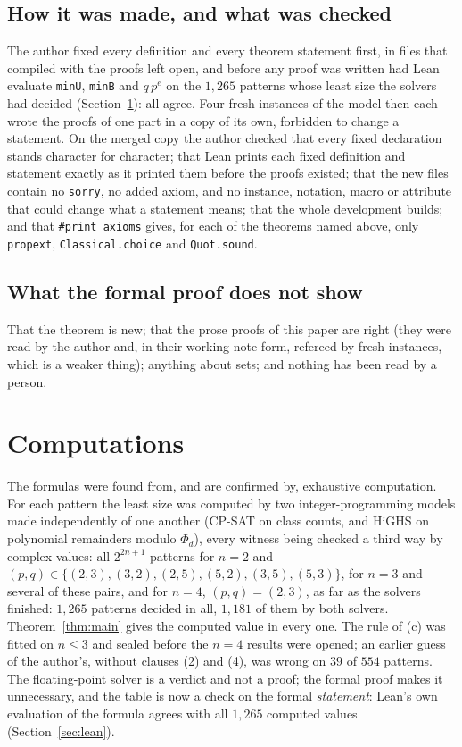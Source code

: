 \documentclass[11pt,a4paper]{amsart}
\theoremstyle{definition}
\theoremstyle{remark}
\newcommand{\lean}[1]{\texttt{#1}}
\begin{document}
\subsection*{How it was made, and what was checked} The author fixed every definition and every theorem
statement first, in files that compiled with the proofs left open, and before any proof was written had Lean
evaluate \lean{minU}, \lean{minB} and $q\,p^{e}$ on the $1{,}265$ patterns whose least size the solvers had
decided (Section~\ref{sec:computations}): all agree. Four fresh instances of the model then each wrote the
proofs of one part in a copy of its own, forbidden to change a statement. On the merged copy the author
checked that every fixed declaration stands character for character; that Lean prints each fixed definition
and statement exactly as it printed them before the proofs existed; that the new files contain no
\lean{sorry}, no added axiom, and no instance, notation, macro or attribute that could change what a statement
means; that the whole development builds; and that \lean{\#print axioms} gives, for each of the theorems named
above, only \lean{propext}, \lean{Classical.choice} and \lean{Quot.sound}. %

\subsection*{What the formal proof does not show} That the theorem is new; that the prose proofs of this
paper are right (they were read by the author and, in their working-note form, refereed by fresh instances,
which is a weaker thing); anything about sets; and nothing has been read by a person.


\section{Computations}\label{sec:computations}

The formulas were found from, and are confirmed by, exhaustive computation. For each pattern the least size
was computed by two integer-programming models made independently of one another (CP-SAT on class counts,
and HiGHS on polynomial remainders modulo $\Phi_d$), every witness being checked a third way by complex
values: all $2^{2n+1}$ patterns for $n=2$ and $(p,q)\in\{(2,3),(3,2),(2,5),(5,2),(3,5),(5,3)\}$, for $n=3$
and several of these pairs, and for $n=4$, $(p,q)=(2,3)$, as far as the solvers finished: $1{,}265$ patterns
decided in all, $1{,}181$ of them by both solvers. Theorem~\ref{thm:main} gives the computed value in every
one. The rule of (c) was fitted on $n\le3$ and sealed before the $n=4$ results were opened; an earlier guess
of the author's, without clauses (2) and (4), was wrong on $39$ of $554$ patterns. The floating-point solver
is a verdict and not a proof; the formal proof makes it unnecessary, and the table is now a check on the
formal \emph{statement}: Lean's own evaluation of the formula agrees with all $1{,}265$ computed values
(Section~\ref{sec:lean}).
\end{document}
